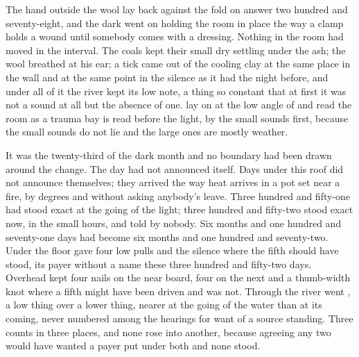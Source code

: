 
The hand outside the wool lay back against the fold on answer two hundred and seventy-eight, and the dark went on holding the room in place the way a clamp holds a wound until somebody comes with a dressing. Nothing in the room had moved in the interval. The coals kept their small dry settling under the ash; the wool breathed at his ear; a tick came out of the cooling clay at the same place in the wall and at the same point in the silence as it had the night before, and under all of it the river kept its low note, a thing so constant that at first it was not a sound at all but the absence of one.  lay on  at the low angle of  and read the room as a trauma bay is read before the light, by the small sounds first, because the small sounds do not lie and the large ones are mostly weather.

It was the twenty-third of the dark month and no boundary had been drawn around the change. The day had not announced itself. Days under this roof did not announce themselves; they arrived the way heat arrives in a pot set near a fire, by degrees and without asking anybody's leave. Three hundred and fifty-one had stood exact at the going of the light; three hundred and fifty-two stood exact now, in the small hours, and told by nobody. Six months and one hundred and seventy-one days had become six months and one hundred and seventy-two. Under the floor  gave four low pulls and the silence where the fifth should have stood, its payer without a name these three hundred and fifty-two days. Overhead  kept four nails on the near board, four on the next and a thumb-width knot where a fifth might have been driven and was not. Through  the river went , a low thing over a lower thing, nearer at the going of the water than at its coming, never numbered among the hearings for want of a source standing. Three counts in three places, and none rose into another, because agreeing any two would have wanted a payer put under both and none stood.

